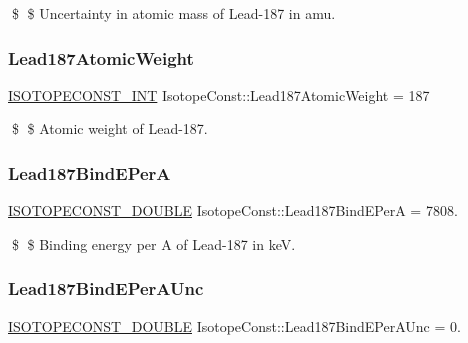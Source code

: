 \$ \$ Uncertainty in atomic mass of Lead-\/187 in amu. \mbox{\label{group___isotope_const-_lead-_pb187_ga4d750a14053609e653415189a7bbdc2e}} 
\subsubsection{\texorpdfstring{Lead187\+Atomic\+Weight}{Lead187AtomicWeight}}
{\footnotesize\ttfamily \mbox{\hyperlink{group___isotope_const-_macros_ga5f18360b3e99483a35c32d789e62621c}{I\+S\+O\+T\+O\+P\+E\+C\+O\+N\+S\+T\+\_\+\+I\+NT}} Isotope\+Const\+::\+Lead187\+Atomic\+Weight = 187}

\$ \$ Atomic weight of Lead-\/187. \mbox{\label{group___isotope_const-_lead-_pb187_ga340793860e1f493f78f59da447a55de1}} 
\subsubsection{\texorpdfstring{Lead187\+Bind\+E\+PerA}{Lead187BindEPerA}}
{\footnotesize\ttfamily \mbox{\hyperlink{group___isotope_const-_macros_ga8f45a7272ce02c0b4c65c44636ed719a}{I\+S\+O\+T\+O\+P\+E\+C\+O\+N\+S\+T\+\_\+\+D\+O\+U\+B\+LE}} Isotope\+Const\+::\+Lead187\+Bind\+E\+PerA = 7808.}

\$ \$ Binding energy per A of Lead-\/187 in keV. \mbox{\label{group___isotope_const-_lead-_pb187_ga47b588406cca85f4b7751e7d65af3884}} 
\subsubsection{\texorpdfstring{Lead187\+Bind\+E\+Per\+A\+Unc}{Lead187BindEPerAUnc}}
{\footnotesize\ttfamily \mbox{\hyperlink{group___isotope_const-_macros_ga8f45a7272ce02c0b4c65c44636ed719a}{I\+S\+O\+T\+O\+P\+E\+C\+O\+N\+S\+T\+\_\+\+D\+O\+U\+B\+LE}} Isotope\+Const\+::\+Lead187\+Bind\+E\+Per\+A\+Unc = 0.}


